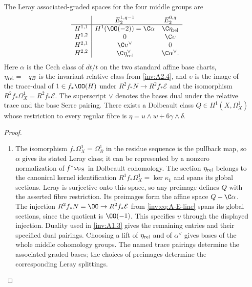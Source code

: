\begin{proposition}\hypertarget{tag-01RZ}{}\label{inv:A3.2}\label{wb:lem:bcpr-eta-extension}

The Leray associated-graded spaces for the four middle groups are
\[
\begin{array}{c|cc}
&E_2^{1,q-1}&E_2^{0,q}\\\hline
H^{1,1}&H^1(\OO(-2))=\C\alpha&\C\eta_{\rm rel}\\
H^{1,2}&0&\C\upsilon\\
H^{2,1}&\C\upsilon^\vee&0\\
H^{2,2}&\C\eta_{\rm rel}^\vee&\C\alpha^\vee.
\end{array}
\]
Here $\alpha$ is the Cech class of $dt/t$ on the two standard affine
base charts, $\eta_{\rm rel}=-q_E$ is the invariant relative class
from \ref{inv:A2.4}, and $\upsilon$ is the image of the trace-dual of
$1\in f_*\OO(H)$ under $R^2f_*N\to R^2f_*\mathcal E$ and the
isomorphism $R^2f_*\Omega_X^1=R^2f_*\mathcal E$.
The superscript $\vee$ denotes the bases dual under the relative
trace and the base Serre pairing.  There exists a Dolbeault class
$Q\in H^1(X,\Omega_X^1)$ whose restriction to every regular fibre
is $\eta=u\wedge w+6\gamma\wedge\delta$.
\end{proposition}


\begin{proof}
\begin{enumerate}[label=\arabic*.,leftmargin=*]
\item The isomorphism $f_*\Omega_X^1=\Omega_B^1$ in the residue sequence
is the pullback map, so $\alpha$ gives its stated Leray
class; it can be represented by a nonzero normalization of
$f^*\omega_{\rm FS}$ in Dolbeault cohomology.  The section
$\eta_{\rm rel}$ belongs to the canonical kernel identification
$R^1f_*\Omega_X^1=\ker\kappa_1$ and spans its global sections.
Leray is surjective onto this space, so any preimage defines $Q$
with the asserted fibre restriction.  Its preimages form the affine space $Q+\C\alpha$.
The injection $R^2f_*N=\OO\to R^2f_*\mathcal E$ from
\eqref{inv:eq:A-E-line} spans its global sections, since the quotient
is $\OO(-1)$.  This specifies $\upsilon$ through the displayed injection.  Duality used in \ref{inv:A1.3} gives the remaining entries
and their specified dual pairings.  Choosing a lift of
$\eta_{\rm rel}$ and of $\alpha^\vee$ gives bases of the whole
middle cohomology groups.  The named trace pairings determine the associated-graded bases;
the choices of preimages determine the corresponding Leray splittings.
\end{enumerate}
\end{proof}